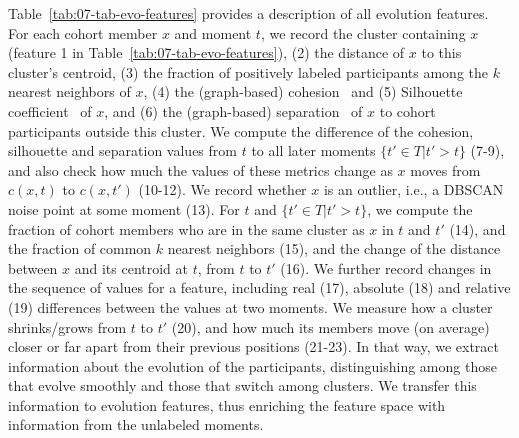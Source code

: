 \documentclass[
  oneside]{book}
\begin{document}
Table~\ref{tab:07-tab-evo-features} provides a description of all evolution features.
For each cohort member \(x\) and moment \(t\), we record the cluster containing \(x\) (feature 1 in Table~\ref{tab:07-tab-evo-features}),
(2) the distance of \(x\) to this cluster's centroid,
(3) the fraction of positively labeled participants among the \(k\) nearest neighbors of \(x\),
(4) the (graph-based) cohesion~\autocite{TanDMbook} and (5) Silhouette coefficient~\autocite{TanDMbook} of \(x\), and (6) the (graph-based) separation~\autocite{TanDMbook} of \(x\) to cohort participants outside this cluster.
We compute the difference of the cohesion, silhouette and separation values from \(t\) to all later moments \(\{t' \in T|t'>t\}\) (7-9), and also check how much the values of these metrics change as \(x\) moves from \(c(x,t)\) to \(c(x,t')\) (10-12).
We record whether \(x\) is an outlier, i.e., a DBSCAN noise point at some moment (13).
For \(t\) and \(\{t' \in T|t'>t\}\), we compute the fraction of cohort members who are in the same cluster as \(x\) in \(t\) and \(t'\) (14), and the fraction of common \(k\) nearest neighbors (15), and the change of the distance between \(x\) and its centroid at \(t\), from \(t\) to \(t'\) (16).
We further record changes in the sequence of values for a feature, including real (17), absolute (18) and relative (19) differences between the values at two moments.
We measure how a cluster shrinks/grows from \(t\) to \(t'\) (20), and how much its members move (on average) closer or far apart from their previous positions (21-23).
In that way, we extract information about the evolution of the participants, distinguishing among those that evolve smoothly and those that switch among clusters.
We transfer this information to evolution features, thus enriching the feature space with information from the unlabeled moments.
\end{document}
